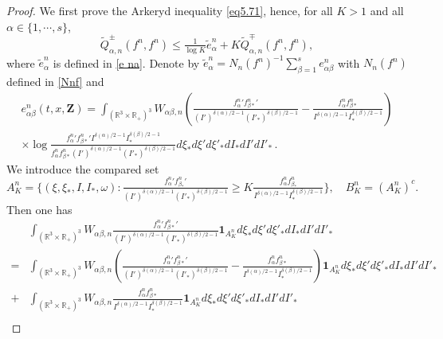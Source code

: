 \documentclass[reqno,11pt]{amsart}
\numberwithin{equation}{section}
\def\R{\mathbb{R}}
\begin{document}
\begin{proof}
We first prove the Arkeryd inequality \eqref{eq5.71}, hence, for all $K>1$ and all $\alpha \in \{1,\cdots,s\}$,
\begin{equation*}
\tilde{Q}^\pm_{\alpha ,n}(f^n,f^n) \leq \tfrac{1}{\log K}\tilde{e}^n_{\alpha} +K\tilde{Q}^\mp_{\alpha ,n}	(f^n,f^n),
\end{equation*}
where $\tilde{e}^n_\alpha$ is defined in \eqref{e na}. Denote by $ \tilde{e}^n_\alpha = N_n (f^n)^{-1} \sum_{\beta = 1}^{s} e^n_{\alpha \beta } $ with $N_n (f^n)$ defined in \eqref{Nnf} and
	\begin{equation*}
		\begin{aligned}
			e^n_{\alpha \beta }(t,x,\mathbf{Z}) 
			= \int_{(\R^3\times \R_+)^3} W_{\alpha \beta ,n} (\tfrac{ f_{\alpha} ^{n}{'} f_{\beta *}^{n}{'} }{(I')^{\delta (\alpha)/2-1} (I'_*)^{\delta(\beta)/2-1} }-\tfrac{f^n_\alpha f^n_{\beta *}}{I^{\delta(\alpha)/2-1} I_*^{\delta(\beta)/2-1}}) \\
\times \log \tfrac{f_\alpha^{n}{'} f_{\beta *}^{n}{'} I^{\delta(\alpha)/2-1} I_*^{\delta(\beta)/2-1} }{f^n_\alpha f^n_{\beta *} (I')^{\delta (\alpha)/2-1} (I'_*)^{\delta(\beta)/2-1}} d\xi_* d\xi' d\xi'_* dI_* dI'dI'_* \,. 
		\end{aligned}
	\end{equation*}
We introduce the compared set
	\begin{equation*}
		A^n_K =  \{(\xi ,\xi_* ,I, I_* ,\omega ):
	\tfrac{f_\alpha^{n}{'} f_{\beta_*}^{n}{'}}{(I')^{\delta (\alpha)/2-1} (I'_*)^{\delta(\beta)/2-1}} \geq K \tfrac{f^n_\alpha f^n_{\beta_*}}{I^{\delta(\alpha)/2-1} I_*^{\delta(\beta)/2-1}}\}, \quad B^n_K = (A^n_K )^c. 		
	\end{equation*}
Then one has
{\small
		\begin{align*}
			&\int_{(\R^3\times \R_+)^3} W_{\alpha \beta,n } \tfrac{ f_{\alpha} ^{n}{'} f_{\beta *}^{n}{'} }{(I')^{\delta (\alpha)/2-1} (I'_*)^{\delta(\beta)/2-1} } \mathbf{1}_{A^n_K} d\xi_* d\xi' d\xi'_* dI_* dI'dI'_*\\
			=& \int_{(\R^3\times \R_+)^3} W_{\alpha \beta,n } (\tfrac{ f_{\alpha} ^{n}{'} f_{\beta *}^{n}{'} }{(I')^{\delta (\alpha)/2-1} (I'_*)^{\delta(\beta)/2-1} }-\tfrac{f^n_\alpha f^n_{\beta *}}{I^{\delta(\alpha)/2-1} I_*^{\delta(\beta)/2-1}}) \mathbf{1}_{A^n_K} d\xi_* d\xi' d\xi'_* dI_* dI'dI'_*\\
			+&\int_{(\R^3\times \R_+)^3} W_{\alpha \beta,n }\tfrac{f^n_\alpha f^n_{\beta *}}{I^{\delta(\alpha)/2-1} I_*^{\delta(\beta)/2-1}} \mathbf{1}_{A^n_K} d\xi_* d\xi' d\xi'_* dI_* dI'dI'_* \\

\end{align*}}
\end{proof}
\end{document}

